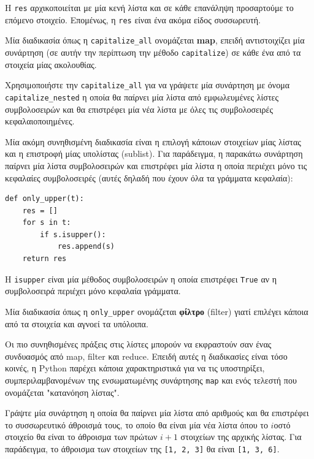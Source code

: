 \documentclass[10pt]{book}
\begin{document}
Η {\tt res} αρχικοποιείται με μία κενή λίστα και σε κάθε επανάληψη προσαρτούμε το επόμενο στοιχείο. Επομένως, η {\tt res} είναι ένα ακόμα είδος συσσωρευτή.

Μία διαδικασία όπως η \verb"capitalize_all" ονομάζεται {\bf map},
επειδή αντιστοιχίζει μία συνάρτηση (σε αυτήν την περίπτωση την μέθοδο {\tt capitalize}) σε κάθε ένα από τα στοιχεία μίας ακολουθίας.
\\

\begin{exercise}

Χρησιμοποιήστε την \verb"capitalize_all" για να γράψετε μία συνάρτηση με όνομα  \verb"capitalize_nested" η οποία θα παίρνει μία λίστα από εμφωλευμένες λίστες συμβολοσειρών και θα επιστρέφει μία νέα λίστα με όλες τις συμβολοσειρές κεφαλαιοποιημένες.
\end{exercise}

Μία ακόμη συνηθισμένη διαδικασία είναι η επιλογή κάποιων στοιχείων μίας λίστας και η επιστροφή μίας υπολίστας (sublist). Για παράδειγμα, η παρακάτω συνάρτηση παίρνει μία λίστα συμβολοσειρών και επιστρέφει μία λίστα η οποία περιέχει
μόνο τις κεφαλαίες συμβολοσειρές (αυτές δηλαδή που έχουν όλα τα γράμματα κεφαλαία):

\begin{verbatim}
def only_upper(t):
    res = []
    for s in t:
        if s.isupper():
            res.append(s)
    return res
\end{verbatim}
%

Η {\tt isupper} είναι μία μέθοδος συμβολοσειρών η οποία επιστρέφει {\tt True}
αν η συμβολοσειρά περιέχει μόνο κεφαλαία γράμματα.

Μία διαδικασία όπως η \verb"only_upper" ονομάζεται {\bf φίλτρο} (filter) γιατί επιλέγει κάποια από τα στοιχεία και αγνοεί τα υπόλοιπα.

Οι πιο συνηθισμένες πράξεις στις λίστες μπορούν να εκφραστούν σαν ένας συνδυασμός από map, filter και reduce. Επειδή αυτές η διαδικασίες είναι τόσο κοινές, η  Python παρέχει κάποια χαρακτηριστικά για να τις υποστηρίξει, συμπεριλαμβανομένων της ενσωματωμένης συνάρτησης {\tt map} και ενός τελεστή που ονομάζεται "κατανόηση λίστας".
\\


\begin{exercise}
\label{cumulative}

Γράψτε μία συνάρτηση η οποία θα παίρνει μία λίστα από αριθμούς και θα επιστρέφει το συσσωρευτικό άθροισμά τους, το οποίο θα είναι μία νέα λίστα όπου το $i$οστό στοιχείο θα είναι το άθροισμα των πρώτων $i+1$ στοιχείων της αρχικής λίστας. Για παράδειγμα, το άθροισμα των στοιχείων της {\tt [1, 2, 3]} θα είναι {\tt [1, 3, 6]}.
\end{exercise}
\end{document}
